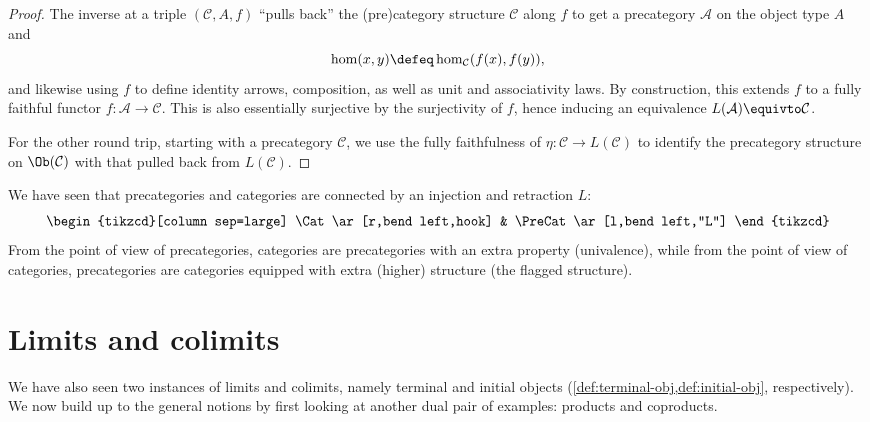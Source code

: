 \begin{proof}
  The inverse at a triple $(\mathcal C,A,f)$
  ``pulls back'' the (pre)category structure $\mathcal C$
  along $f$ to get a precategory $\mathcal A$ on the object type $A$ and
  \[
    \hom(x,y) \defeq \hom_{\mathcal C}(f(x), f(y)),
  \]
  and likewise using $f$ to define identity arrows, composition, as well
  as unit and associativity laws. By construction, this extends $f$
  to a fully faithful functor $f : \mathcal A \to \mathcal C$.
  This is also essentially surjective by the surjectivity of $f$,
  hence inducing an equivalence $L(\mathcal A) \equivto \mathcal C$.

  For the other round trip, starting with a precategory $\mathcal C$,
  we use the fully faithfulness of $\eta : \mathcal C \to L(\mathcal C)$
  to identify the precategory structure on $\Ob(\mathcal C)$ with that
  pulled back from $L(\mathcal C)$.
\end{proof}
\begin{remark}\label{rem:chicken-or-egg}
  We have seen that precategories and categories
  are connected by an injection and retraction $L$:
  \[
    \begin{tikzcd}[column sep=large]
      \Cat\ar[r,bend left,hook] &
      \PreCat\ar[l,bend left,"L"]
    \end{tikzcd}
  \]
  From the point of view of precategories,
  categories are precategories with an extra property
  (univalence), while from the point of view of categories,
  precategories are categories equipped with extra (higher) structure
  (the flagged structure).
\end{remark}

\section{Limits and colimits}
\label{sec:limits}

We have also seen two instances of limits and colimits,
namely terminal and initial objects
(\cref{def:terminal-obj,def:initial-obj}, respectively).
We now build up to the general notions by first looking at
another dual pair of examples: products and coproducts.

